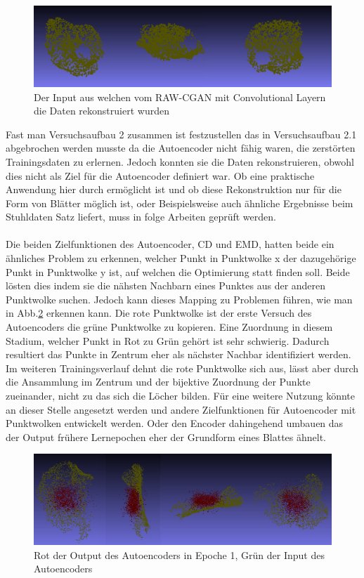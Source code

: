 \documentclass{llncs}
\begin{document}
\begin{figure}[htbp] 
	\centering
	\includegraphics[width=1.0\textwidth]{raw_cgan_ws_real.png}
	\caption{Der Input aus welchen vom RAW-CGAN mit Convolutional Layern die Daten rekonstruiert wurden}
	\label{fig:Bild83}
\end{figure}
Fast man Versuchsaufbau 2 zusammen ist festzustellen das in Versuchsaufbau 2.1 abgebrochen werden musste da die Autoencoder nicht fähig waren, die zerstörten Trainingsdaten zu erlernen. Jedoch konnten sie die Daten rekonstruieren, obwohl dies nicht als Ziel für die Autoencoder definiert war. Ob eine praktische Anwendung hier durch ermöglicht ist und ob diese Rekonstruktion nur für die Form von Blätter möglich ist, oder Beispielsweise auch ähnliche Ergebnisse beim Stuhldaten Satz liefert, muss in folge Arbeiten geprüft werden.
\\\\
Die beiden Zielfunktionen des Autoencoder, CD und EMD, hatten beide ein ähnliches Problem zu erkennen, welcher Punkt in Punktwolke x der dazugehörige Punkt in Punktwolke y ist, auf welchen die Optimierung statt finden soll. Beide lösten dies indem sie die nähsten Nachbarn eines Punktes aus der anderen Punktwolke suchen.  Jedoch kann dieses Mapping zu Problemen führen, wie man in Abb.\ref{fig:Bild1005} erkennen kann. Die rote Punktwolke ist der erste Versuch des Autoencoders die grüne Punktwolke zu kopieren. Eine Zuordnung in diesem Stadium, welcher Punkt in Rot zu Grün gehört ist sehr schwierig. Dadurch resultiert das Punkte in Zentrum eher als nächster Nachbar identifiziert werden. Im weiteren Trainingsverlauf dehnt die rote Punktwolke sich aus, lässt aber durch die Ansammlung im Zentrum und der bijektive Zuordnung der Punkte zueinander, nicht zu das sich die Löcher bilden. Für eine weitere Nutzung könnte an dieser Stelle angesetzt werden und andere Zielfunktionen für Autoencoder mit Punktwolken entwickelt werden. Oder den Encoder dahingehend umbauen das der Output frühere Lernepochen eher der Grundform eines Blattes ähnelt. 
\begin{figure}[htbp] 
	\centering
	\includegraphics[width=1.0\textwidth]{problem_autoencoder.png}
	\caption{Rot der Output des Autoencoders in Epoche 1, Grün der Input des Autoencoders }
	\label{fig:Bild1005}
\end{figure}
\end{document}
